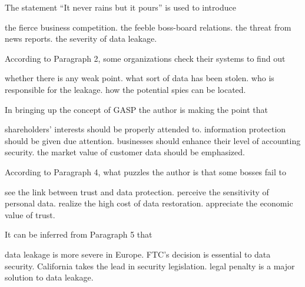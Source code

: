 \item The statement ``It never rains but it pours'' is used to introduce
\begin{tasks}
	\task the fierce business competition.
	\task the feeble boss-board relations.
	\task the threat from news reports.
	\task the severity of data leakage.
\end{tasks}
\item According to Paragraph 2, some organizations check their systems to find out
\begin{tasks}
	\task whether there is any weak point.
	\task what sort of data has been stolen.
	\task who is responsible for the leakage.
	\task how the potential spies can be located.
\end{tasks}
\item In bringing up the concept of GASP the author is making the point that
\begin{tasks}
	\task shareholders' interests should be properly attended to.
	\task information protection should be given due attention.
	\task businesses should enhance their level of accounting security.
	\task the market value of customer data should be emphasized.
\end{tasks}
\item According to Paragraph 4, what puzzles the author is that some bosses fail to
\begin{tasks}
	\task see the link between trust and data protection.
	\task perceive the sensitivity of personal data.
	\task realize the high cost of data restoration.
	\task appreciate the economic value of trust.
\end{tasks}
\item It can be inferred from Paragraph 5 that
\begin{tasks}
	\task data leakage is more severe in Europe.
	\task FTC's decision is essential to data security.
	\task California takes the lead in security legislation.
	\task legal penalty is a major solution to data leakage.
\end{tasks}